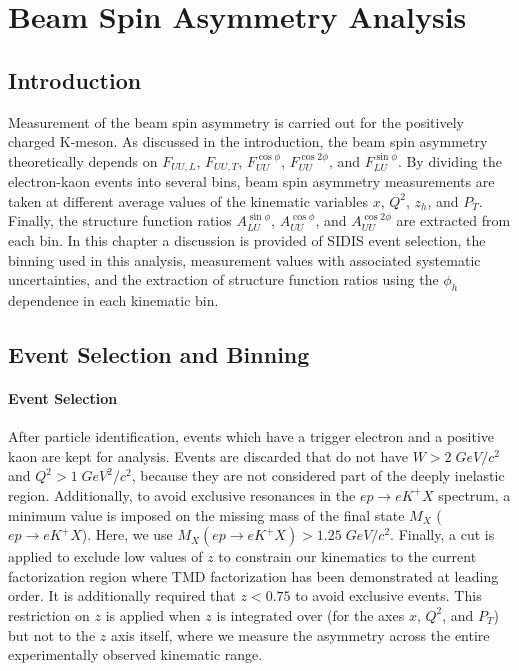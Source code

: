 %
%

\chapter{Beam Spin Asymmetry Analysis}

\section{Introduction}
Measurement of the beam spin asymmetry is carried out for the positively charged K-meson.  As discussed in the introduction, the beam spin asymmetry theoretically depends on $F_{UU,L}$, $F_{UU,T}$, $F_{UU}^{\cos\phi}$, $F_{UU}^{\cos 2\phi}$, and $F_{LU}^{\sin\phi}$.  By dividing the electron-kaon events into several bins, beam spin asymmetry measurements are taken at different average values of the kinematic variables $x$, $Q^2$, $z_h$, and $P_T$.  Finally, the structure function ratios $A_{LU}^{\sin\phi}$, $A_{UU}^{\cos\phi}$, and $A_{UU}^{\cos 2\phi}$ are extracted from each bin.  In this chapter a discussion is provided of SIDIS event selection, the binning used in this analysis, measurement values with associated systematic uncertainties, and the extraction of structure function ratios using the $\phi_h$ dependence in each kinematic bin.

\section{Event Selection and Binning}
\subsubsection*{Event Selection}
After particle identification, events which have a trigger electron and a positive kaon are kept for analysis.  Events are discarded that do not have $W > 2 \; GeV/c^2$ and $Q^2 > 1 \; GeV^2/c^2$, because they are not considered part of the deeply inelastic region.  Additionally, to avoid exclusive resonances in the $ep \rightarrow eK^+X$ spectrum, a minimum value is imposed on the missing mass of the final state $M_X$ ($ep \rightarrow eK^+X$).  Here, we use $M_{X} (ep \rightarrow eK^+X) > 1.25 \; GeV/c^2$.  Finally, a cut is applied to exclude low values of $z$ to constrain our kinematics to the current factorization region where TMD factorization has been demonstrated at leading order.  It is additionally required that $z < 0.75$ to avoid exclusive events.  This restriction on $z$ is applied when $z$ is integrated over (for the axes $x$, $Q^2$, and $P_T$) but not to the $z$ axis itself, where we measure the asymmetry across the entire experimentally observed kinematic range.  

